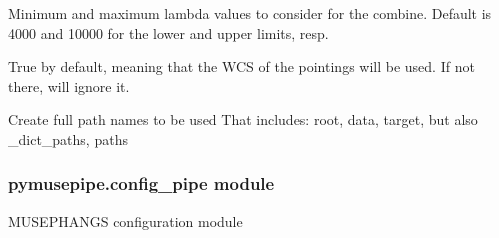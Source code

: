 \documentclass[letterpaper,10pt,english]{sphinxmanual}
\begin{document}
\begin{fulllineitems}
\begin{fulllineitems}
\begin{description}
\sphinxAtStartPar
Minimum and maximum lambda values to consider for the combine.
Default is 4000 and 10000 for the lower and upper limits, resp.

\sphinxAtStartPar
True by default, meaning that the WCS of the pointings will be used.
If not there, will ignore it.

\end{description}

\end{fulllineitems}


\begin{fulllineitems}
\label{\detokenize{api/pymusepipe:pymusepipe.combine.MusePointings.set_fullpath_names}}
\pysigstartsignatures
{}
\pysigstopsignatures
\sphinxAtStartPar
Create full path names to be used
That includes: root, data, target, but also \_dict\_paths, paths

\end{fulllineitems}


\end{fulllineitems}



\subsubsection{pymusepipe.config\_pipe module}
\label{\detokenize{api/pymusepipe:module-pymusepipe.config_pipe}}\label{\detokenize{api/pymusepipe:pymusepipe-config-pipe-module}}
\sphinxAtStartPar
MUSE\sphinxhyphen{}PHANGS configuration module

\begin{fulllineitems}
\label{\detokenize{api/pymusepipe:pymusepipe.config_pipe.get_suffix_product}}
\pysigstartsignatures
{}
\pysigstopsignatures
\end{fulllineitems}
\end{document}
